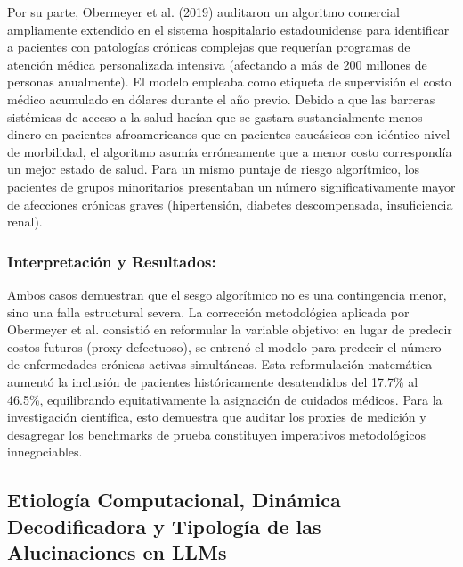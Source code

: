 Por su parte, Obermeyer et al. (2019) auditaron un algoritmo comercial ampliamente extendido en el sistema hospitalario estadounidense para identificar a pacientes con patologías crónicas complejas que requerían programas de atención médica personalizada intensiva (afectando a más de 200 millones de personas anualmente). El modelo empleaba como etiqueta de supervisión el costo médico acumulado en dólares durante el año previo. Debido a que las barreras sistémicas de acceso a la salud hacían que se gastara sustancialmente menos dinero en pacientes afroamericanos que en pacientes caucásicos con idéntico nivel de morbilidad, el algoritmo asumía erróneamente que a menor costo correspondía un mejor estado de salud. Para un mismo puntaje de riesgo algorítmico, los pacientes de grupos minoritarios presentaban un número significativamente mayor de afecciones crónicas graves (hipertensión, diabetes descompensada, insuficiencia renal).

\subsubsection*{Interpretación y Resultados:}
Ambos casos demuestran que el sesgo algorítmico no es una contingencia menor, sino una falla estructural severa. La corrección metodológica aplicada por Obermeyer et al. consistió en reformular la variable objetivo: en lugar de predecir costos futuros (proxy defectuoso), se entrenó el modelo para predecir el número de enfermedades crónicas activas simultáneas. Esta reformulación matemática aumentó la inclusión de pacientes históricamente desatendidos del 17.7\% al 46.5\%, equilibrando equitativamente la asignación de cuidados médicos. Para la investigación científica, esto demuestra que auditar los proxies de medición y desagregar los benchmarks de prueba constituyen imperativos metodológicos innegociables.


\subsection{Etiología Computacional, Dinámica Decodificadora y Tipología de las Alucinaciones en LLMs}


